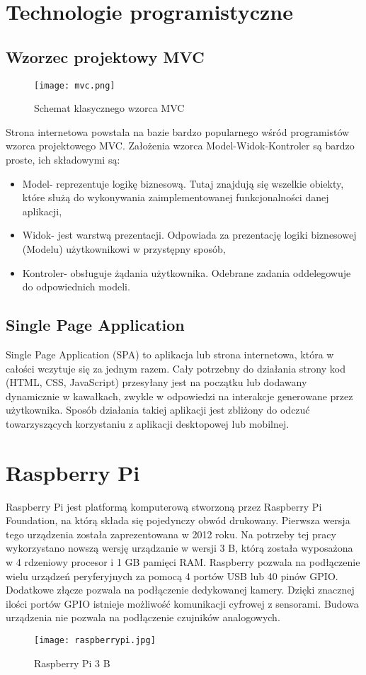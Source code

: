 \section{Technologie programistyczne}
\subsection{Wzorzec projektowy MVC}
\begin{figure}[H]
	\centering
	\texttt{[image: mvc.png]}
	\caption{Schemat klasycznego wzorca MVC}
	\label{fig:schemat_mvc}
\end{figure}
Strona internetowa powstała na bazie bardzo popularnego wśród programistów wzorca projektowego MVC. Założenia wzorca Model-Widok-Kontroler są bardzo proste, ich składowymi są:
\begin{itemize}
\item Model- reprezentuje logikę biznesową. Tutaj znajdują się wszelkie obiekty, które służą do wykonywania zaimplementowanej funkcjonalności danej aplikacji,
\item Widok- jest warstwą prezentacji. Odpowiada za prezentację logiki biznesowej (Modelu) użytkownikowi w przystępny sposób,
\item Kontroler- obsługuje żądania użytkownika. Odebrane zadania oddelegowuje do odpowiednich modeli.
\end{itemize}

\subsection{Single Page Application}
Single Page Application (SPA) to aplikacja lub strona internetowa, która w całości wczytuje się za jednym razem. Cały potrzebny do działania strony kod (HTML, CSS, JavaScript) przesyłany jest na początku lub dodawany dynamicznie w kawałkach, zwykle w odpowiedzi na interakcje generowane przez użytkownika.
Sposób działania takiej aplikacji jest zbliżony do odczuć towarzyszących korzystaniu z aplikacji desktopowej lub mobilnej.

\section{Raspberry Pi}
Raspberry Pi jest platformą komputerową stworzoną przez Raspberry Pi Foundation, na którą składa się pojedynczy obwód drukowany. Pierwsza wersja tego urządzenia została zaprezentowana w 2012 roku. Na potrzeby tej pracy wykorzystano nowszą wersję urządzanie w wersji 3 B, którą została wyposażona w 4 rdzeniowy procesor i 1 GB pamięci RAM. Raspberry pozwala na podłączenie wielu urządzeń peryferyjnych za pomocą 4 portów USB lub 40 pinów GPIO. Dodatkowe złącze pozwala na podłączenie dedykowanej kamery. Dzięki znacznej ilości portów GPIO istnieje możliwość komunikacji cyfrowej z sensorami. Budowa urządzenia nie pozwala na podłączenie czujników analogowych.
\begin{figure}[H]
	\centering
	\texttt{[image: raspberrypi.jpg]}
	\caption{Raspberry Pi 3 B}
	\label{fig:raspberrypi}
\end{figure}

